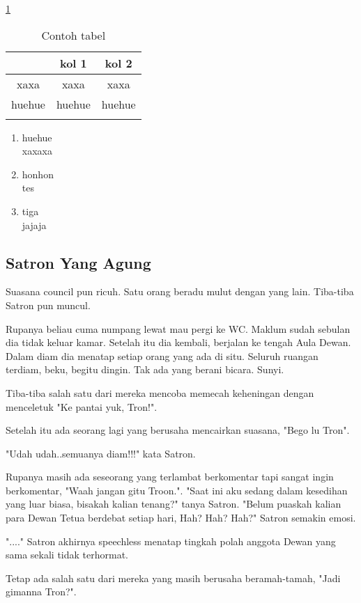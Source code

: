 \begin{table}
	\centering
	\caption{Contoh tabel}\label{tabel1}\ref{tabel1}
	\begin{tabular}{| c | c c |}
		\hline
		& kol 1 & kol 2\\
		\hline
		xaxa & xaxa & xaxa \\
		huehue & huehue & huehue \\
		\hlin
	\end{tabular}
\end{table}

\begin{enumerate}
	\item huehue\\
	xaxaxa
	\item honhon\\
	tes
	\item tiga\\
	jajaja
\end{enumerate}

\subsection{Satron Yang Agung}
Suasana council pun ricuh. 
Satu orang beradu mulut dengan yang lain. 
Tiba-tiba Satron pun muncul.

Rupanya beliau cuma numpang lewat mau pergi ke WC. 
Maklum sudah sebulan dia tidak keluar kamar.
Setelah itu dia kembali, berjalan ke tengah Aula Dewan. 
Dalam diam dia menatap setiap orang yang ada di situ. 
Seluruh ruangan terdiam, beku, begitu dingin. 
Tak ada yang berani bicara. 
Sunyi.

Tiba-tiba salah satu dari mereka mencoba memecah keheningan dengan 
menceletuk "Ke pantai yuk, Tron!".

Setelah itu ada seorang lagi yang berusaha mencairkan suasana, 
"Bego lu Tron".

"Udah udah..semuanya diam!!!" kata Satron.

Rupanya masih ada seseorang yang terlambat berkomentar tapi sangat 
ingin berkomentar, "Waah jangan gitu Troon.".
"Saat ini aku sedang dalam kesedihan yang luar biasa, bisakah 
kalian tenang?" tanya Satron. 
"Belum puaskah kalian para Dewan Tetua berdebat setiap hari, 
Hah? Hah? Hah?" Satron semakin emosi.

"...." Satron akhirnya speechless menatap tingkah polah anggota 
Dewan yang sama sekali tidak terhormat.

Tetap ada salah satu dari mereka yang masih berusaha 
beramah-tamah, "Jadi gimanna Tron?".

